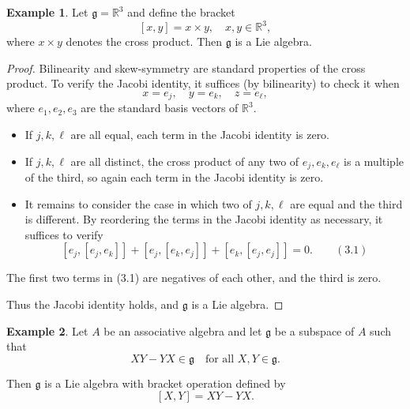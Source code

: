 \documentclass[
]{book}
\providecommand{\tightlist}{%
  \setlength{\itemsep}{0pt}\setlength{\parskip}{0pt}}
\theoremstyle{definition}
\theoremstyle{definition}
\newtheorem{example}{Example}[chapter]
\theoremstyle{definition}
\theoremstyle{definition}
\theoremstyle{remark}
\begin{document}
\begin{example}
\protect\hypertarget{exm:unnamed-chunk-11}{}\label{exm:unnamed-chunk-11}Let \(\mathfrak{g} = \mathbb{R}^3\) and define the bracket
\[[x,y] = x \times y, \quad x,y \in \mathbb{R}^3,\]
where \(x \times y\) denotes the cross product. Then \(\mathfrak{g}\) is a Lie algebra.
\end{example}

\begin{proof}
Bilinearity and skew-symmetry are standard properties of the cross product. To verify the Jacobi identity, it suffices (by bilinearity) to check it when
\[x = e_j, \quad y = e_k, \quad z = e_\ell,\]
where \(e_1, e_2, e_3\) are the standard basis vectors of \(\mathbb{R}^3\).

\begin{itemize}
\tightlist
\item
  If \(j,k,\ell\) are all equal, each term in the Jacobi identity is zero.
\item
  If \(j,k,\ell\) are all distinct, the cross product of any two of \(e_j, e_k, e_\ell\) is a multiple of the third, so again each term in the Jacobi identity is zero.
\item
  It remains to consider the case in which two of \(j,k,\ell\) are equal and the third is different. By reordering the terms in the Jacobi identity as necessary, it suffices to verify
  \[[e_j,[e_j,e_k]] + [e_j,[e_k,e_j]] + [e_k,[e_j,e_j]] = 0. \qquad (3.1)\]
\end{itemize}

The first two terms in (3.1) are negatives of each other, and the third is zero.

Thus the Jacobi identity holds, and \(\mathfrak{g}\) is a Lie algebra.
\end{proof}

\begin{example}
\protect\hypertarget{exm:unnamed-chunk-13}{}\label{exm:unnamed-chunk-13}Let \(A\) be an associative algebra and let \(\mathfrak{g}\) be a subspace of \(A\) such that
\[XY - YX \in \mathfrak{g} \quad \text{for all } X,Y \in \mathfrak{g}.\]

Then \(\mathfrak{g}\) is a Lie algebra with bracket operation defined by
\[[X,Y] = XY - YX.\]
\end{example}
\end{document}
